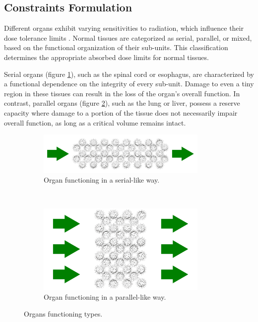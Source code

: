 \subsection{Constraints Formulation}
Different organs exhibit varying sensitivities to radiation, which influence their dose tolerance limits \cite{RodneyWithers1988} \cite{ICRU83}.
Normal tissues are categorized as serial, parallel, or mixed, based on the functional organization of their sub-units.
This classification determines the appropriate absorbed dose limits for normal tissues.

Serial organs (figure \ref{fig:serial_organ}), such as the spinal cord or esophagus, are characterized by a functional dependence on the integrity of every sub-unit.
Damage to even a tiny region in these tissues can result in the loss of the organ's overall function.
In contrast, parallel organs (figure \ref{fig:parallel_organ}), such as the lung or liver, possess a reserve capacity where damage to a portion of the tissue does not necessarily impair overall function, as long as a critical volume remains intact.

\begin{figure}
	\begin{subfigure}{0.6\textwidth}
		\centering
		\includegraphics[width=0.9\textwidth]{serial_organ.pdf}
		\vspace{4mm}
		\caption{Organ functioning in a serial-like way.}
		\label{fig:serial_organ}
	\end{subfigure}
	\hfill
	\unskip\ \vrule\
	\hfill
	\begin{subfigure}{0.38\textwidth}
		\centering
		\includegraphics[width=0.9\textwidth]{parallel_organ.pdf}
		\caption{Organ functioning in a parallel-like way.}
		\label{fig:parallel_organ}
	\end{subfigure}
	\caption{Organs functioning types.}
	\label{fig:serial_parallel_organ}	
\end{figure}

